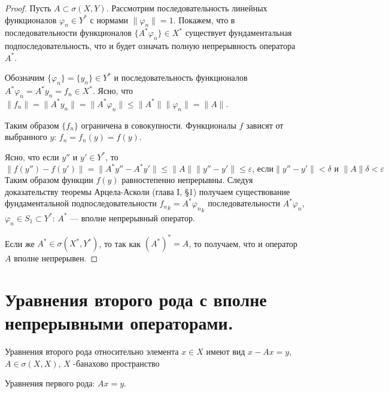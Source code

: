 \documentclass[12pt,a4paper,titlepage,oneside]{book}
\theoremstyle{definition}
\theoremstyle{plain}
\theoremstyle{break}
\theoremstyle{remark}
\theoremstyle{remark}
\theoremstyle{remark}
\theoremstyle{remark}
\theoremstyle{plain}
\theoremstyle{plain}
\begin{document}
\begin{proof}
Пусть $A\subset\sigma(X, Y)$. Рассмотрим последовательность линейных функционалов $\varphi_n\in Y^*$ с нормами $\lVert \varphi_n\rVert = 1$. Покажем, что в последовательности функционалов $\{A^*\varphi_n\}\in X^*$ существует фундаментальная подпоследовательность, что и будет означать полную непрерывность оператора $A^*$.

Обозначим $\{\varphi_n\} = \{y_n\}\in Y^*$ и последовательность функционалов $A^*\varphi_n = A^*y_n = f_n\in X^*$. Ясно, что $\lVert f_n\rVert = \lVert A^*y_n\rVert = \lVert A^*\varphi_n\rVert \leqslant \lVert A^*\rVert\lVert \varphi_n\rVert = \lVert A\rVert$.

Таким образом $\{f_n\}$ ограничена в совокупности. Функционалы $f$ зависят от выбранного $y$: $f_n = f_n(y) = f(y)$.

Ясно, что если $y''$ и $y'\in Y^*$, то
\begin{equation*}
\lVert f(y'')-f(y')\rVert = \lVert A^*y''-A^*y'\rVert\le\lVert A\rVert\lVert y''-y'\rVert\le\varepsilon\mbox{, если} \lVert y''-y'\rVert < \delta\mbox{ и }\lVert A\rVert\delta < \varepsilon
\end{equation*}
Таким образом функции $f(y)$ равностепенно непрерывны. Следуя доказательству теоремы Арцела-Асколи (глава I, \S 1) получаем существование фундаментальной подпоследовательности ${f_n}_k = A^*{\varphi_n}_k$ последовательности $A^*\varphi_n$, $\varphi_n\in S_1\subset Y^*$: $A^*$ --- вполне непрерывный оператор.

Если же $A^*\in\sigma(X^*,Y^*)$, то так как $(A^*)^* = A$, то получаем, что и оператор $A$ вполне непрерывен.
\end{proof}

\section{Уравнения второго рода с вполне непрерывными операторами.}
Уравнения второго рода относительно элемента $x \in X$ имеют вид $x-Ax=y$, $A \in \sigma(X,X)$, $X$ -банахово пространство

Уравнения первого рода: $Ax=y$.
\end{document}
